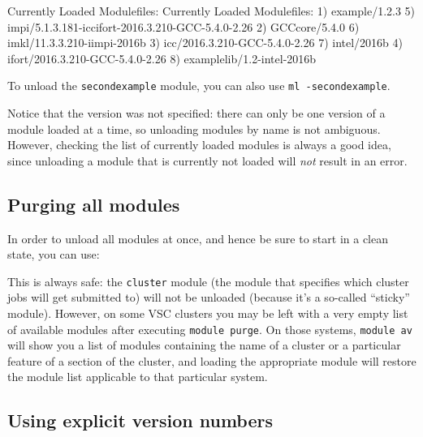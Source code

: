 \begin{prompt}
Currently Loaded Modulefiles:
Currently Loaded Modulefiles:
1) example/1.2.3                                          5) impi/5.1.3.181-iccifort-2016.3.210-GCC-5.4.0-2.26
2) GCCcore/5.4.0                                          6) imkl/11.3.3.210-iimpi-2016b
3) icc/2016.3.210-GCC-5.4.0-2.26                          7) intel/2016b
4) ifort/2016.3.210-GCC-5.4.0-2.26                        8) examplelib/1.2-intel-2016b
\end{prompt}

\ifusinglmod
To unload the \lstinline|secondexample| module, you can also use \lstinline|ml -secondexample|.
\fi

Notice that the version was not specified: there can only be one version of a module
loaded at a time, so unloading modules by name is not ambiguous.
However, checking the list of currently loaded modules is always a good idea,
since unloading a module that is currently not loaded will \emph{not} result in an error.


\subsection{Purging all modules}
\label{subsec:purging-modules}

In order to unload all modules at once, and hence be sure to start in a clean
state, you can use:

\begin{prompt}
\end{prompt}

\ifgent
This is always safe: the \lstinline|cluster| module (the module that specifies which cluster
jobs will get submitted to) will not be unloaded (because it's a so-called ``sticky'' module).
\else
However, on some VSC clusters you may be left with a very empty list of available
modules after executing \lstinline|module purge|. On those systems, \lstinline|module av| will show you a list of
modules containing the name of a cluster or a particular feature of a section of
the cluster, and loading the appropriate module will restore the module list
applicable to that particular system.
\fi

\subsection{Using explicit version numbers}
\label{subsec:explicit-version-numbers}

